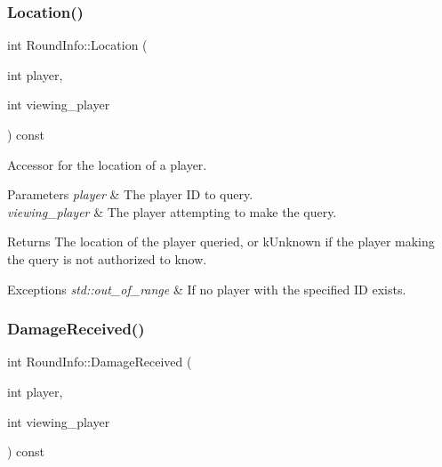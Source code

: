 \subsubsection{\texorpdfstring{Location()}{Location()}}
{\footnotesize\ttfamily int Round\+Info\+::\+Location (\begin{DoxyParamCaption}\item[{int}]{player,  }\item[{int}]{viewing\+\_\+player }\end{DoxyParamCaption}) const}



Accessor for the location of a player. 


\begin{DoxyParams}{Parameters}
{\em player} & The player ID to query. \\
\hline
{\em viewing\+\_\+player} & The player attempting to make the query. \\
\hline
\end{DoxyParams}
\begin{DoxyReturn}{Returns}
The location of the player queried, or {\ttfamily k\+Unknown} if the player making the query is not authorized to know. 
\end{DoxyReturn}

\begin{DoxyExceptions}{Exceptions}
{\em std\+::out\+\_\+of\+\_\+range} & If no player with the specified ID exists. \\
\hline
\end{DoxyExceptions}
\mbox{\label{classroundinfo_1_1_round_info_a2b6c4500a8076cb24f83591f05b99fba}} 
\subsubsection{\texorpdfstring{Damage\+Received()}{DamageReceived()}}
{\footnotesize\ttfamily int Round\+Info\+::\+Damage\+Received (\begin{DoxyParamCaption}\item[{int}]{player,  }\item[{int}]{viewing\+\_\+player }\end{DoxyParamCaption}) const}



